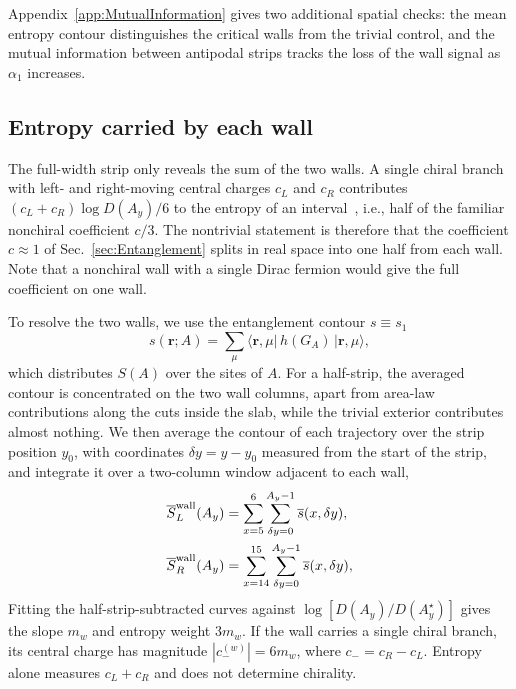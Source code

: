 \documentclass[aps,prb,10pt,twocolumn,superscriptaddress,longbibliography,floatfix]{revtex4-2}
\newcommand{\bfr}{\boldsymbol r}
\newcommand{\newtext}[1]{{\color{blue}#1}}
\begin{document}
{\color{blue}
Appendix~\ref{app:MutualInformation} gives two additional spatial checks: the mean entropy contour distinguishes the critical walls from the trivial control, and the mutual information between antipodal strips tracks the loss of the wall signal as $\alpha_1$ increases.
}

{\color{blue}\subsection{Entropy carried by each wall}
\label{sec:ChiralCentralCharge}}

The full-width strip only reveals the sum of the two walls. A single chiral branch with left- and right-moving central charges $c_L$ and $c_R$ contributes \newtext{$(c_L+c_R)\log D(A_y)/6$} to the entropy of an interval~\cite{CalabreseCardy2004,CastroDetournayIqbalPerlmutter2014}, i.e., half of the familiar nonchiral coefficient $c/3$. The nontrivial statement is therefore that the coefficient $c\approx1$ of Sec.~\ref{sec:Entanglement} splits in real space into one half from each wall. Note that a nonchiral wall with a single Dirac fermion would give the full coefficient on one wall.

{\color{blue}
To resolve the two walls, we use the entanglement contour $s\equiv s_1$~\cite{BhuiyanPanJian2026}
\begin{equation}
    s(\bfr;A)=\sum_\mu\langle\bfr,\mu|\,h(G_A)\,|\bfr,\mu\rangle,
    \label{eq:Contour}
\end{equation}
which distributes $S(A)$ over the sites of $A$. For a half-strip, the averaged contour is concentrated on the two wall columns, apart from area-law contributions along the cuts inside the slab, while the trivial exterior contributes almost nothing.
We then average the contour of each trajectory over the strip position $y_0$, with coordinates $\delta y=y-y_0$ measured from the start of the strip, and integrate it over a two-column window adjacent to each wall,
\begin{align}
    \overline{S}^{\rm wall}_{L}(A_y)&=\sum_{x=5}^{6}\sum_{\delta y=0}^{A_y-1}\overline{s}(x,\delta y),\nonumber\\
    \overline{S}^{\rm wall}_{R}(A_y)&=\sum_{x=14}^{15}\sum_{\delta y=0}^{A_y-1}\overline{s}(x,\delta y),
    \label{eq:WallEntropy}
\end{align}
\newtext{Fitting the half-strip-subtracted curves against $\log[D(A_y)/D(A_y^\star)]$ gives the slope $m_w$ and entropy weight $3m_w$. If the wall carries a single chiral branch, its central charge has magnitude $|c_-^{(w)}|=6m_w$, where $c_-=c_R-c_L$. Entropy alone measures $c_L+c_R$ and does not determine chirality.}
}
\end{document}
